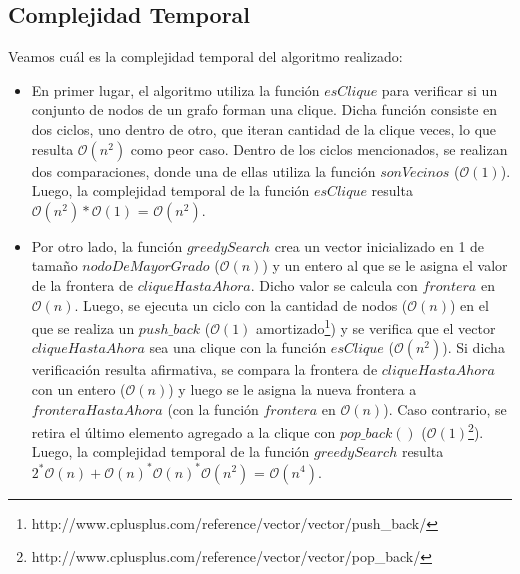 \subsection{Complejidad Temporal}
Veamos cuál es la complejidad temporal del algoritmo realizado:
\begin{itemize}
\item En primer lugar, el algoritmo utiliza la función $esClique$ para verificar si un conjunto de nodos de un grafo forman una clique. Dicha función consiste en dos ciclos, uno dentro de otro, que iteran cantidad de la clique veces, lo que resulta $\mathcal{O}(n^2)$ como peor caso. Dentro de los ciclos mencionados, se realizan dos comparaciones, donde una de ellas utiliza la función $sonVecinos$ ($\mathcal{O}(1)$). Luego, la complejidad temporal de la función $esClique$ resulta $\mathcal{O}(n^2)*\mathcal{O}(1)$ = $\mathcal{O}(n^2)$.

\item Por otro lado, la función $greedySearch$ crea un vector inicializado en 1 de tamaño $nodoDeMayorGrado$ ($\mathcal{O}(n)$) y un entero al que se le asigna el valor de la frontera de $cliqueHastaAhora$. Dicho valor se calcula con $frontera$ en $\mathcal{O}(n)$. Luego, se ejecuta un ciclo con la cantidad de nodos ($\mathcal{O}(n)$) en el que se realiza un $push\_back$ ($\mathcal{O}(1)$ amortizado\footnote{http://www.cplusplus.com/reference/vector/vector/push\_back/}) y se verifica que el vector $cliqueHastaAhora$ sea una clique con la función $esClique$ ($\mathcal{O}(n^2)$). Si dicha verificación resulta afirmativa, se compara la frontera de $cliqueHastaAhora$ con un entero ($\mathcal{O}(n)$) y luego se le asigna la nueva frontera a $fronteraHastaAhora$ (con la función $frontera$ en $\mathcal{O}(n)$). Caso contrario, se retira el último elemento agregado a la clique con $pop\_back()$ ($\mathcal{O}(1)$\footnote{http://www.cplusplus.com/reference/vector/vector/pop\_back/}).\newline
\newline
Luego, la complejidad temporal de la función $greedySearch$ resulta $2^*\mathcal{O}(n)+\mathcal{O}(n)^*\mathcal{O}(n)^*\mathcal{O}(n^2)$ = $\mathcal{O}(n^4)$.

\end{itemize}
